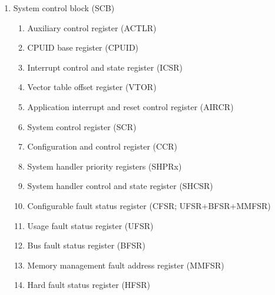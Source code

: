 \documentclass{article}
\begin{document}
\begin{enumerate}
\begin{enumerate}
\begin{enumerate}
            \item Interrupt set-pending registers (NVIC\_ISPRx) 
            \item Interrupt clear-pending registers (NVIC\_ICPRx) 
            \item Interrupt active bit registers (NVIC\_IABRx) 
            \item Interrupt priority registers (NVIC\_IPRx) 
            \item Software trigger interrupt register (NVIC\_STIR) 
            \item Level-sensitive and pulse interrupts 
            \item NVIC design hints and tips 
            \item NVIC register map 
        \end{enumerate}
        \item System control block (SCB) 
        \begin{enumerate}
            \item Auxiliary control register (ACTLR) 
            \item CPUID base register (CPUID) 
            \item Interrupt control and state register (ICSR) 
            \item Vector table offset register (VTOR) 
            \item Application interrupt and reset control register (AIRCR) 
            \item System control register (SCR) 
            \item Configuration and control register (CCR) 
            \item System handler priority registers (SHPRx) 
            \item System handler control and state register (SHCSR) 
            \item Configurable fault status register (CFSR; UFSR+BFSR+MMFSR) 
            \item Usage fault status register (UFSR) 
            \item Bus fault status register (BFSR) 
            \item Memory management fault address register (MMFSR) 
            \item Hard fault status register (HFSR) 

\end{enumerate}
\end{enumerate}
\end{enumerate}
\end{document}

